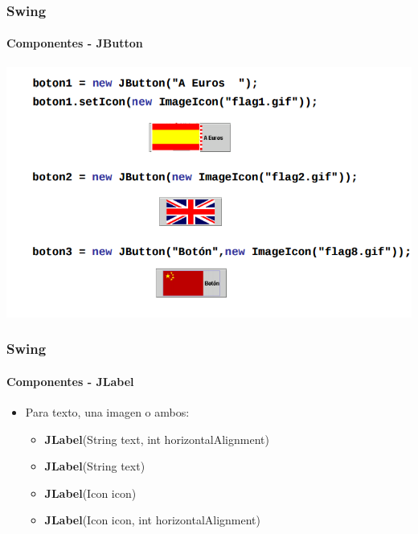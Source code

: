 \documentclass{beamer}
\begin{document}
	\begin{frame}
		\frametitle{Swing}
		\framesubtitle{Componentes - JButton}

        \begin{center}
	        	\includegraphics[scale=.45]{images/ejemplo-jbutton.png}
	    \end{center}
	\end{frame}

    \begin{frame}
		\frametitle{Swing}
		\framesubtitle{Componentes - JLabel}

        \begin{itemize}
		    \item[\checkmark] Para texto, una imagen o ambos:
		    \begin{itemize}
        		    \item[] \textbf{JLabel}(String text, int horizontalAlignment)
        		    \item[] \textbf{JLabel}(String text)
        		    \item[] \textbf{JLabel}(Icon icon)
        		    \item[] \textbf{JLabel}(Icon icon, int horizontalAlignment)
	    	    \end{itemize}
		\end{itemize}
	\end{frame}
\end{document}
